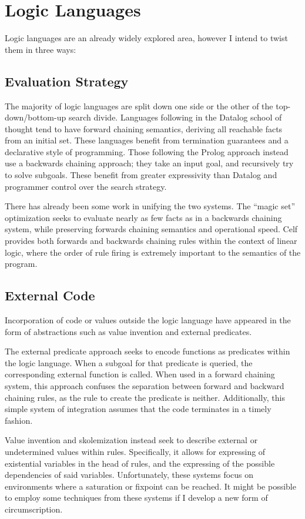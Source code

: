\section{Logic Languages}
Logic languages are an already widely explored area, however I intend to twist them in three ways:
\subsection{Evaluation Strategy}
The majority of logic languages are split down one side or the other of the top-down/bottom-up search divide.
Languages following in the Datalog\cite{datalog} school of thought tend to have forward chaining semantics, deriving all reachable facts from an initial set.
These languages benefit from termination guarantees and a declarative style of programming.
Those following the Prolog\cite{prolog} approach instead use a backwards chaining approach;
they take an input goal, and recursively try to solve subgoals.
These benefit from greater expressivity than Datalog and programmer control over the search strategy.

There has already been some work in unifying the two systems.
The ``magic set''\cite{magicset} optimization seeks to evaluate nearly as few facts as in a backwards chaining system, while preserving forwards chaining semantics and operational speed.
Celf\cite{celf} provides both forwards and backwards chaining rules within the context of linear logic, where the order of rule firing is extremely important to the semantics of the program.
\subsection{External Code}
Incorporation of code or values outside the logic language have appeared in the form of abstractions such as value invention and external predicates.

The external predicate approach seeks to encode functions as predicates within the logic language.
When a subgoal for that predicate is queried, the corresponding external function is called\cite{gnuprolog}.
When used in a forward chaining system, this approach confuses the separation between forward and backward chaining rules, as the rule to create the predicate is neither.
Additionally, this simple system of integration assumes that the code terminates in a timely fashion.

Value invention and skolemization\cite{Calimeri2007a,Bry2010a} instead seek to describe external or undetermined values within rules.
Specifically, it allows for expressing of existential variables in the head of rules, and the expressing of the possible dependencies of said variables.
Unfortunately, these systems focus on environments where a saturation or fixpoint can be reached.
It might be possible to employ some techniques from these systems if I develop a new form of circumscription\cite{circumscription}.


